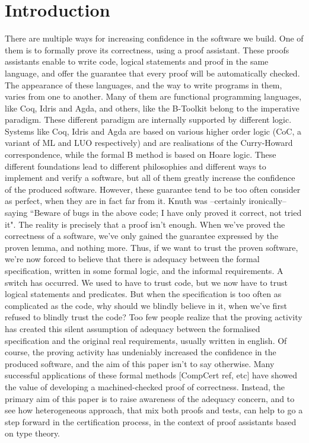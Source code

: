\section{Introduction}

There are multiple ways for increasing confidence in the software we build. One of them is to formally prove its correctness, using a proof assistant. These proofs assistants enable to write code, logical statements and proof in the same language, and offer the guarantee that every proof will be automatically checked. The appearance of these languages, and the way to write programs in them, varies from one to another. Many of them are functional programming languages, like Coq, Idris and Agda, and others, like the B-Toolkit belong to the imperative paradigm. These different paradigm are internally supported by different logic. Systems like Coq, Idris and Agda are based on various higher order logic (CoC, a variant of ML and LUO respectively) and are realisations of the Curry-Howard correspondence, while the formal B method is based on Hoare logic. These different foundations lead to different philosophies and different ways to implement and verify a software, but all of them greatly increase the confidence of the produced software. However, these guarantee tend to be too often consider as perfect, when they are in fact far from it. Knuth was --certainly ironically-- saying ``Beware of bugs in the above code; I have only proved it correct, not tried it". The reality is precisely that a proof isn't enough. When we've proved the correctness of a software, we've only gained the guarantee expressed by the proven lemma, and nothing more. Thus, if we want to trust the proven software, we're now forced to believe that there is adequacy between the formal specification, written in some formal logic, and the informal requirements. A switch has occurred. We used to have to trust code, but we now have to trust logical statements and predicates. But when the specification is too often as complicated as the code, why should we blindly believe in it, when we've first refused to blindly trust the code? Too few people realize that the proving activity has created this silent assumption of adequacy between the formalised specification and the original real requirements, usually written in english. Of course, the proving activity has undeniably increased the confidence in the produced software, and the aim of this paper isn't to say otherwise. Many successful applications of these formal methods [CompCert ref, etc] have showed the value of developing a machined-checked proof of correctness. Instead, the primary aim of this paper is to raise awareness of the adequacy concern, and to see how heterogeneous approach, that mix both proofs and tests, can help to go a step forward in the certification process, in the context of proof assistants based on type theory.
